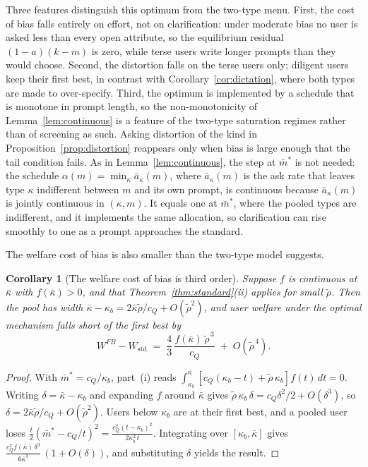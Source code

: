 \documentclass[11pt]{article}
\newtheorem{corollary}{Corollary}
\begin{document}
Three features distinguish this optimum from the two-type menu. First, the cost of bias falls entirely on effort, not on clarification: under moderate bias no user is asked less than every open attribute, so the equilibrium residual $(1-a)(k-m)$ is zero, while terse users write longer prompts than they would choose. Second, the distortion falls on the terse users only; diligent users keep their first best, in contrast with Corollary~\ref{cor:dictation}, where both types are made to over-specify. Third, the optimum is implemented by a schedule that is monotone in prompt length, so the non-monotonicity of Lemma~\ref{lem:continuous} is a feature of the two-type saturation regimes rather than of screening as such. Asking distortion of the kind in Proposition~\ref{prop:distortion} reappears only when bias is large enough that the tail condition fails. As in Lemma~\ref{lem:continuous}, the step at $\bar m^*$ is not needed: the schedule $\alpha(m) = \min_\kappa \bar a_\kappa(m)$, where $\bar a_\kappa(m)$ is the ask rate that leaves type $\kappa$ indifferent between $m$ and its own prompt, is continuous because $\bar a_\kappa(m)$ is jointly continuous in $(\kappa, m)$. It equals one at $\bar m^*$, where the pooled types are indifferent, and it implements the same allocation, so clarification can rise smoothly to one as a prompt approaches the standard.

The welfare cost of bias is also smaller than the two-type model suggests.

\begin{corollary}[The welfare cost of bias is third order]
\label{cor:thirdorder}
Suppose $f$ is continuous at $\bar\kappa$ with $f(\bar\kappa) > 0$, and that Theorem~\ref{thm:standard}(ii) applies for small $\tilde\rho$. Then the pool has width $\bar\kappa - \kappa_b = 2\bar\kappa\tilde\rho/c_Q + O(\tilde\rho^2)$, and user welfare under the optimal mechanism falls short of the first best by
\[
W^{FB} - W_{\text{std}} \;=\; \frac{4}{3}\, \frac{f(\bar\kappa)\,\tilde\rho^{\,3}}{c_Q} \;+\; O(\tilde\rho^{\,4}).
\]
\end{corollary}

\begin{proof}
With $\bar m^* = c_Q/\kappa_b$, part~(i) reads $\int_{\kappa_b}^{\bar\kappa} [c_Q(\kappa_b - t) + \tilde\rho\,\kappa_b] f(t)\,dt = 0$. Writing $\delta = \bar\kappa - \kappa_b$ and expanding $f$ around $\bar\kappa$ gives $\tilde\rho\,\kappa_b\,\delta = c_Q\delta^2/2 + O(\delta^3)$, so $\delta = 2\bar\kappa\tilde\rho/c_Q + O(\tilde\rho^2)$. Users below $\kappa_b$ are at their first best, and a pooled user loses $\frac{t}{2}(\bar m^* - c_Q/t)^2 = \frac{c_Q^2 (t - \kappa_b)^2}{2\kappa_b^2\, t}$. Integrating over $[\kappa_b, \bar\kappa]$ gives $\frac{c_Q^2 f(\bar\kappa)\,\delta^3}{6\bar\kappa^3}\,(1 + O(\delta))$, and substituting $\delta$ yields the result.
\end{proof}
\end{document}
